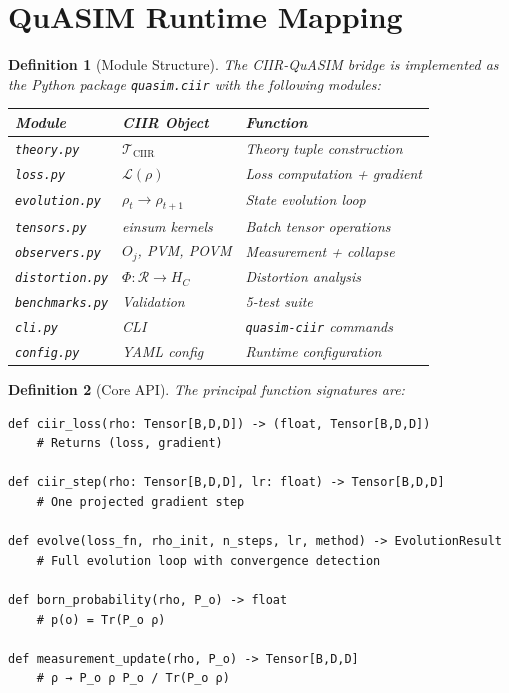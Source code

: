 \documentclass[11pt,a4paper]{article}
\newtheorem{definition}{Definition}[section]
\newcommand{\CR}{\mathcal{R}}
\newcommand{\HC}{H_C}
\newcommand{\CL}{\mathcal{L}}
\begin{document}
\section{QuASIM Runtime Mapping}
\label{sec:quasim}

\begin{definition}[Module Structure]
\label{def:modules}
The CIIR-QuASIM bridge is implemented as the Python package
\texttt{quasim.ciir} with the following modules:

\begin{center}
\begin{tabular}{lll}
Module & CIIR Object & Function \\
\hline
\texttt{theory.py} & $\mathcal{T}_{\mathrm{CIIR}}$ & Theory tuple construction \\
\texttt{loss.py} & $\CL(\rho)$ & Loss computation + gradient \\
\texttt{evolution.py} & $\rho_t \to \rho_{t+1}$ & State evolution loop \\
\texttt{tensors.py} & einsum kernels & Batch tensor operations \\
\texttt{observers.py} & $O_j$, PVM, POVM & Measurement + collapse \\
\texttt{distortion.py} & $\Phi: \CR \to \HC$ & Distortion analysis \\
\texttt{benchmarks.py} & Validation & 5-test suite \\
\texttt{cli.py} & CLI & \texttt{quasim-ciir} commands \\
\texttt{config.py} & YAML config & Runtime configuration \\
\end{tabular}
\end{center}
\end{definition}

\begin{definition}[Core API]
\label{def:api}
The principal function signatures are:
\begin{verbatim}
def ciir_loss(rho: Tensor[B,D,D]) -> (float, Tensor[B,D,D])
    # Returns (loss, gradient)

def ciir_step(rho: Tensor[B,D,D], lr: float) -> Tensor[B,D,D]
    # One projected gradient step

def evolve(loss_fn, rho_init, n_steps, lr, method) -> EvolutionResult
    # Full evolution loop with convergence detection

def born_probability(rho, P_o) -> float
    # p(o) = Tr(P_o ρ)

def measurement_update(rho, P_o) -> Tensor[B,D,D]
    # ρ → P_o ρ P_o / Tr(P_o ρ)
\end{verbatim}
\end{definition}
\end{document}
